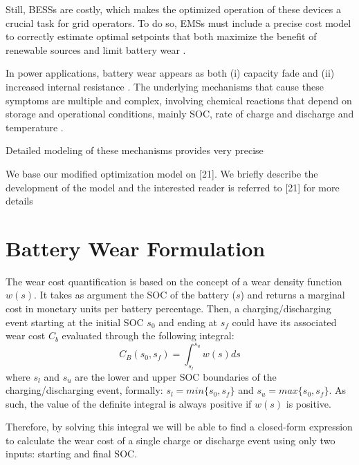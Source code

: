 \documentclass{ieeeaccess}
\begin{document}
        Still, \acp{BESS} are costly, which makes the optimized operation of these devices a crucial task for grid operators. To do so, \acp{EMS} must include a precise cost model to correctly estimate optimal setpoints that both maximize the benefit of renewable sources and limit battery wear \cite{STECCA2020, PAPA2014}.

        In power applications, battery wear appears as both (i) capacity fade and (ii) increased internal resistance \cite{han2014comparative, chemali2015minimizing, al2010mathematical}. The underlying mechanisms that cause these symptoms are multiple and complex, involving chemical reactions that depend on storage and operational conditions, mainly \ac{SOC}, rate of charge and discharge and temperature \cite{vetter2005ageing, calearo2019modeling}.

        Detailed modeling of these mechanisms provides very precise

        We base our modified optimization model on [21]. We briefly
        describe the development of the model and the interested reader
        is referred to [21] for more details


\section{Battery Wear Formulation}

    The wear cost quantification is based on the concept of a wear density function $w(s)$. It takes as argument the SOC of the battery ($s$) and returns a marginal cost in monetary units per battery percentage. Then, a charging/discharging event starting at the initial SOC $s_{0}$ and ending at $s_{f}$ could have its associated wear cost $C_{b}$ evaluated through the following integral:
    \begin{equation}
        C_{B}(s_{0}, s_{f}) = \int_{s_{l}}^{s_{u}}w(s)ds
        \label{eq:Cb(s0,sf)}
    \end{equation}
    where $s_{l}$ and $s_{u}$ are the lower and upper SOC boundaries of the charging/discharging event, formally: $s_{l} = min\{s_{0}, s_{f}\}$ and $s_{u} = max\{s_{0}, s_{f}\}$. As such, the value of the definite integral is always positive if $w(s)$ is positive.

    Therefore, by solving this integral we will be able to find a closed-form expression to calculate the wear cost of a single charge or discharge event using only two inputs: starting and final SOC.
\end{document}
